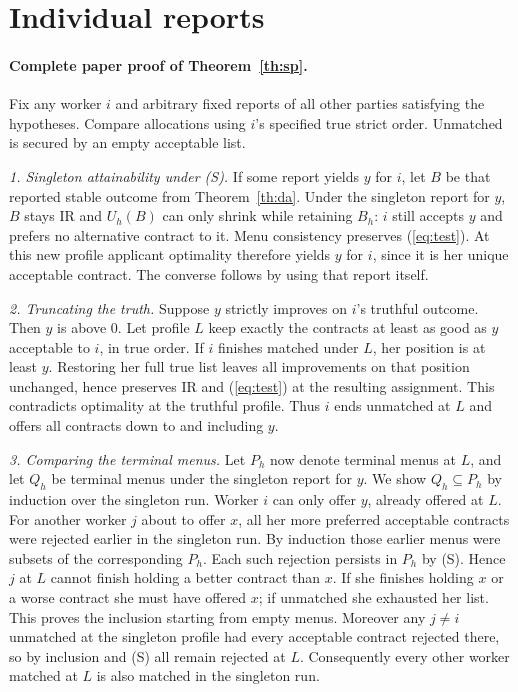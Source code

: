 \documentclass[11pt]{article}
\begin{document}
\section{Individual reports}\label{app:sp}
\paragraph{Complete paper proof of Theorem~\ref{th:sp}.}
Fix any worker $i$ and arbitrary fixed reports of all other parties satisfying the hypotheses. Compare allocations using $i$'s specified true strict order. Unmatched is secured by an empty acceptable list.

\textit{1. Singleton attainability under (S).}
If some report yields $y$ for $i$, let $B$ be that reported stable outcome from Theorem~\ref{th:da}. Under the singleton report for $y$, $B$ stays IR and $U_h(B)$ can only shrink while retaining $B_h$: $i$ still accepts $y$ and prefers no alternative contract to it. Menu consistency preserves (\ref{eq:test}). At this new profile applicant optimality therefore yields $y$ for $i$, since it is her unique acceptable contract. The converse follows by using that report itself.

\textit{2. Truncating the truth.}
Suppose $y$ strictly improves on $i$'s truthful outcome. Then $y$ is above $0$. Let profile $L$ keep exactly the contracts at least as good as $y$ acceptable to $i$, in true order. If $i$ finishes matched under $L$, her position is at least $y$. Restoring her full true list leaves all improvements on that position unchanged, hence preserves IR and (\ref{eq:test}) at the resulting assignment. This contradicts optimality at the truthful profile. Thus $i$ ends unmatched at $L$ and offers all contracts down to and including $y$.

\textit{3. Comparing the terminal menus.}
Let $P_h$ now denote terminal menus at $L$, and let $Q_h$ be terminal menus under the singleton report for $y$. We show $Q_h\subseteq P_h$ by induction over the singleton run. Worker $i$ can only offer $y$, already offered at $L$. For another worker $j$ about to offer $x$, all her more preferred acceptable contracts were rejected earlier in the singleton run. By induction those earlier menus were subsets of the corresponding $P_h$. Each such rejection persists in $P_h$ by (S). Hence $j$ at $L$ cannot finish holding a better contract than $x$. If she finishes holding $x$ or a worse contract she must have offered $x$; if unmatched she exhausted her list. This proves the inclusion starting from empty menus. Moreover any $j\ne i$ unmatched at the singleton profile had every acceptable contract rejected there, so by inclusion and (S) all remain rejected at $L$. Consequently every other worker matched at $L$ is also matched in the singleton run.
\end{document}
